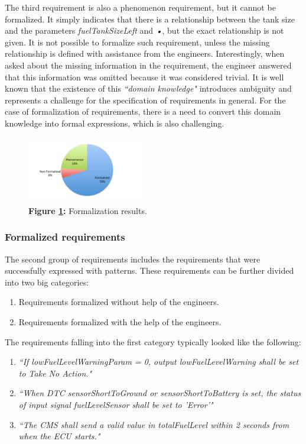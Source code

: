 \documentclass[conference]{IEEEtran}
\begin{document}
The third requirement is also a phenomenon requirement, but it cannot be formalized. It simply indicates that there is a relationship between the tank size and the parameters  \textit{fuelTankSizeLeft} and \textit{•}, but the exact relationship is not  given. 
It is not possible to formalize such requirement, unless the missing relationship is defined with assistance from the engineers. Interestingly, when asked about the missing information in the requirement, the engineer answered that this information was omitted because it was considered trivial. 
It is well known that the existence of this \textit{``domain knowledge"} introduces ambiguity and represents a challenge for the specification of requirements in general. For the case of formalization of requirements, there is a need to convert this domain knowledge into formal expressions, which is also challenging.

\begin{figure}
  \centering
    \includegraphics[width=0.47\textwidth]{main_formalization_results.pdf}
      \caption{\textbf{Figure \ref{fig:mainResults}:} Formalization results.}
      \label{fig:mainResults}
\end{figure}


\subsubsection*{\textbf{Formalized requirements}}
The second group of requirements includes the requirements that were successfully expressed with patterns. These requirements can be further divided into two big categories:
\begin{enumerate}
\item Requirements formalized without help of the engineers.
\item Requirements formalized with the help of the engineers.
\end{enumerate} 

The requirements falling into the first category typically looked like the following: 

\begin{enumerate}

\item \textit{``If lowFuelLevelWarningParam = 0, output lowFuelLevelWarning shall be set to Take No Action."}

\item \textit{``When DTC sensorShortToGround or sensorShortToBattery is set, the status of input signal fuelLevelSensor shall be set to ’Error’"}

\item \textit{``The CMS shall send a valid value in totalFuelLevel within 2 seconds from when the ECU starts."}\\
\end{enumerate}
\end{document}

